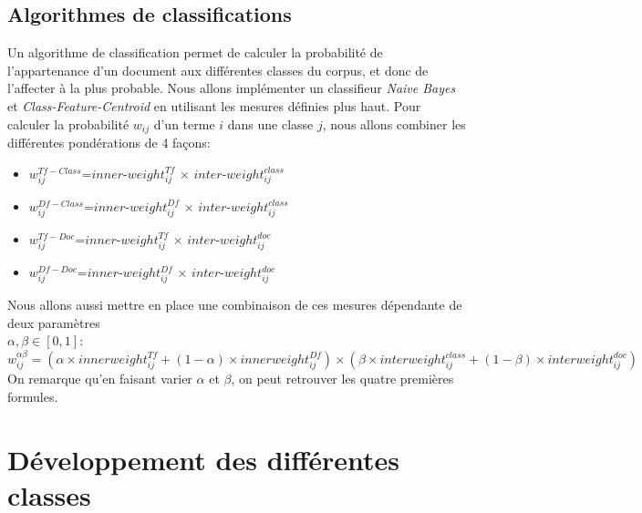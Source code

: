 \documentclass{article}
\begin{document}
\subsection{Algorithmes de classifications}
Un algorithme de classification permet de calculer la probabilité de l'appartenance d'un document aux différentes classes du corpus, et donc de l'affecter à la plus probable. Nous allons implémenter un classifieur \textit{Naive Bayes} et \textit{Class-Feature-Centroid}\cite{RNTIB} en utilisant les mesures définies plus haut. Pour calculer la probabilité $w_{ij}$ d'un terme $i$ dans une classe $j$, nous allons combiner les différentes pondérations de 4 façons:
\medskip
\begin{itemize}
\item $w_{ij}^{Tf-Class}$=$inner$-$weight_{ij}^{Tf}$ $\times$ $inter$-$weight_{ij}^{class}$
\item $w_{ij}^{Df-Class}$=$inner$-$weight_{ij}^{Df}$ $\times$ $inter$-$weight_{ij}^{class}$
\item $w_{ij}^{Tf-Doc}$=$inner$-$weight_{ij}^{Tf}$ $\times$ $inter$-$weight_{ij}^{doc}$
\item $w_{ij}^{Df-Doc}$=$inner$-$weight_{ij}^{Df}$ $\times$ $inter$-$weight_{ij}^{doc}$
\end{itemize}
\bigskip
Nous allons aussi mettre en place une combinaison de ces mesures dépendante de deux paramètres\\ $\alpha,\beta \in [0,1]$:
\[ w_{ij}^{ \alpha \beta}=(\alpha \times innerweight_{ij}^{Tf} + (1-\alpha)\times innerweight_{ij}^{Df} )\times(\beta \times interweight_{ij}^{class} + (1-\beta) \times interweight_{ij}^{doc} )\]
On remarque qu'en faisant varier $\alpha$ et $\beta$, on peut retrouver les quatre premières formules.



\section{Développement des différentes classes}\label{sec:classes}
\end{document}
